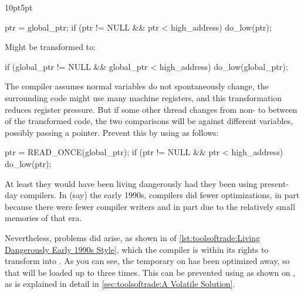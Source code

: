 \begin{listing}[tb]
\begin{adjustwidth}{10pt}{5pt}
\footnotesize
\renewcommand{\myfvline}{A\arabic{FancyVerbLine}}
\begin{fcvlabel}
\begin{VerbatimT}[commandchars=\\\[\]]
ptr = global_ptr;			\lnlbl[A1]
if (ptr != NULL && ptr < high_address)	\lnlbl[A2]
	do_low(ptr);			\lnlbl[A3]
\end{VerbatimT}
Might be transformed to:
\renewcommand{\myfvline}{B\arabic{FancyVerbLine}}
\begin{VerbatimT}[commandchars=\\\[\]]
if (global_ptr != NULL &&		\lnlbl[B1]
    global_ptr < high_address)		\lnlbl[B2]
	do_low(global_ptr);		\lnlbl[B3]
\end{VerbatimT}
\begin{fcvref}
The compiler assumes normal variables do not spontaneously change,
the surrounding code  might use many machine registers, and this
transformation reduces register pressure.
But if some other thread changes  from non-
to  between  of the transformed code, the
two comparisons will be against different variables, possibly passing
 a  pointer.
Prevent this by using  as follows:
\end{fcvref}
\renewcommand{\myfvline}{C\arabic{FancyVerbLine}}
\begin{VerbatimT}[commandchars=\\\[\]]
ptr = READ_ONCE(global_ptr);			\lnlbl[C1]
if (ptr != NULL && ptr < high_address)		\lnlbl[C2]
	do_low(ptr);				\lnlbl[C3]
\end{VerbatimT}
\end{fcvlabel}
\end{adjustwidth}
\caption{Living Dangerously Early 1990s Style}
\label{lst:toolsoftrade:Living Dangerously Early 1990s Style}
\end{listing}

At least they would have been living dangerously had they been using
present-day compilers.
In (say) the early 1990s, compilers did fewer optimizations, in part
because there were fewer compiler writers and in part due to the
relatively small memories of that era.
\begin{fcvref}
Nevertheless, problems did arise, as shown in
 of
\cref{lst:toolsoftrade:Living Dangerously Early 1990s Style},
which the compiler is within its rights to transform into
.
As you can see, the temporary on  has been optimized away, so
that  will be loaded up to three times.
This can be prevented using  as shown on ,
as is explained in detail in
\cref{sec:toolsoftrade:A Volatile Solution}.
\end{fcvref}

